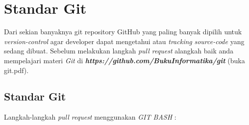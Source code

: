 \chapter{Standar Git}
Dari sekian banyaknya git repository GitHub yang paling banyak dipilih\cite{kalliamvakou2014promises} untuk \textit{version-control} agar developer dapat mengetahui atau \textit{tracking} \textit{source-code} yang sedang dibuat. Sebelum melakukan langkah \textit{pull request} alangkah baik anda mempelajari materi \textit{Git} di \textbf{\textit{https://github.com/BukuInformatika/git}} (buka git.pdf).

\section{Standar Git}
Langkah-langkah \textit{pull request} menggunakan \textit{GIT BASH} :
